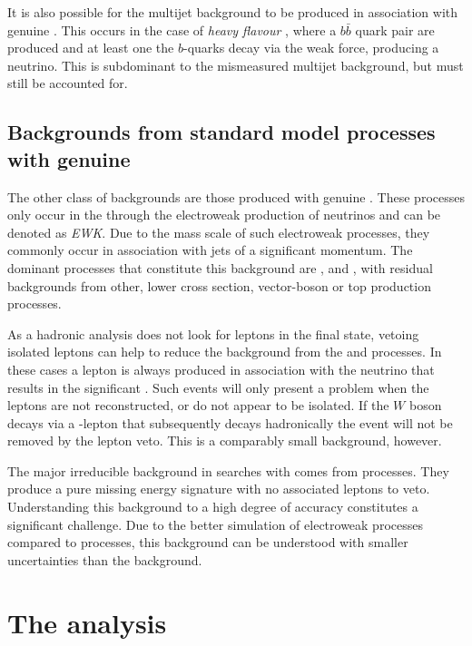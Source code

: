 It is also possible for the \QCD multijet background to be produced in
association with genuine \MET. This occurs in the case of \emph{heavy
flavour} \QCD, where a $b\bar{b}$ quark pair are produced and at least
one the $b$-quarks decay via the weak force, producing a neutrino.
This is subdominant to the mismeasured multijet background, but must
still be accounted for. 


\subsection{Backgrounds from standard model processes with genuine
\MET}

The other class of \SM backgrounds are those produced with genuine
\MET. These processes only occur in the \SM through the electroweak
production of neutrinos and can be denoted as \emph{EWK}. Due to the
mass scale of such electroweak processes, they commonly occur in
association with jets of a significant momentum. The dominant
processes that constitute this background are \wj, \znunu and \ttbar,
with residual backgrounds from other, lower cross section,
vector-boson or top production processes.

As a hadronic analysis does not look for leptons in the final state,
vetoing isolated leptons can help to reduce the background from the
\wj and \ttbar processes. In these cases a lepton is always produced
in association with the neutrino that results in the significant \MET.
Such events will only present a problem when the leptons are not
reconstructed, or do not appear to be isolated.  If the $W$ boson
decays via a \tau-lepton that subsequently decays hadronically the
event will not be removed by the lepton veto.  This is a comparably
small background, however.

The major irreducible background in \BSM searches with \MET comes from 
\znunu processes. They produce a pure missing energy signature with no
associated leptons to veto. Understanding this background to a high
degree of accuracy constitutes a significant challenge. Due to the
better simulation of electroweak processes compared to \QCD processes,
this background can be understood with smaller uncertainties than the
\QCD background.

\section{The \alphat analysis} 

